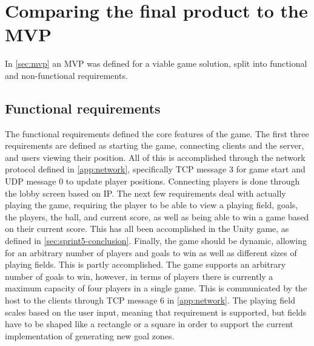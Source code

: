 \section{Comparing the final product to the MVP}
In \autoref{sec:mvp} an MVP was defined for a viable game solution, split into functional and non-functional requirements.

\subsection{Functional requirements}
The functional requirements defined the core features of the game.
The first three requirements are defined as starting the game, connecting clients and the server, and users viewing their position.
All of this is accomplished through the network protocol defined in \autoref{app:network}, specifically TCP message 3 for game start and UDP message 0 to update player positions.
Connecting players is done through the lobby screen based on IP.
The next few requirements deal with actually playing the game, requiring the player to be able to view a playing field, goals, the players, the ball, and current score, as well as being able to win a game based on their current score.
This has all been accomplished in the Unity game, as defined in \autoref{sec:sprint5-conclusion}.
Finally, the game should be dynamic, allowing for an arbitrary number of players and goals to win as well as different sizes of playing fields.
This is partly accomplished.
The game supports an arbitrary number of goals to win, however, in terms of players there is currently a maximum capacity of four players in a single game.
This is communicated by the host to the clients through TCP message 6 in \autoref{app:network}.
The playing field scales based on the user input, meaning that requirement is supported, but fields have to be shaped like a rectangle or a square in order to support the current implementation of generating new goal zones.

